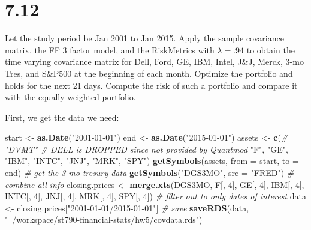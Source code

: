 \documentclass[11pt,]{article}
\newenvironment{Shaded}{\begin{snugshade}}{\end{snugshade}}
\newcommand{\CommentTok}[1]{\textcolor[rgb]{0.56,0.35,0.01}{\textit{#1}}}
\newcommand{\DataTypeTok}[1]{\textcolor[rgb]{0.13,0.29,0.53}{#1}}
\newcommand{\DecValTok}[1]{\textcolor[rgb]{0.00,0.00,0.81}{#1}}
\newcommand{\KeywordTok}[1]{\textcolor[rgb]{0.13,0.29,0.53}{\textbf{#1}}}
\newcommand{\NormalTok}[1]{#1}
\newcommand{\StringTok}[1]{\textcolor[rgb]{0.31,0.60,0.02}{#1}}
\begin{document}
\hypertarget{section-3}{%
\section{7.12}\label{section-3}}

Let the study period be Jan 2001 to Jan 2015. Apply the sample
covariance matrix, the FF 3 factor model, and the RiskMetrics with
\(\lambda = .94\) to obtain the time varying covariance matrix for Dell,
Ford, GE, IBM, Intel, J\&J, Merck, 3-mo Tres, and S\&P500 at the
beginning of each month. Optimize the portfolio and holds for the next
21 days. Compute the risk of such a portfolio and compare it with the
equally weighted portfolio.

First, we get the data we need:

\begin{Shaded}
\begin{Highlighting}[]
\NormalTok{start <-}\StringTok{ }\KeywordTok{as.Date}\NormalTok{(}\StringTok{"2001-01-01"}\NormalTok{)}
\NormalTok{end <-}\StringTok{ }\KeywordTok{as.Date}\NormalTok{(}\StringTok{"2015-01-01"}\NormalTok{)}
\NormalTok{assets <-}\StringTok{ }\KeywordTok{c}\NormalTok{(}\CommentTok{# "DVMT" # DELL is DROPPED since not provided by Quantmod}
  \StringTok{"F"}\NormalTok{, }
  \StringTok{"GE"}\NormalTok{, }
  \StringTok{"IBM"}\NormalTok{, }
  \StringTok{"INTC"}\NormalTok{,}
  \StringTok{"JNJ"}\NormalTok{,}
  \StringTok{"MRK"}\NormalTok{,}
  \StringTok{"SPY"}\NormalTok{)}
\KeywordTok{getSymbols}\NormalTok{(assets, }\DataTypeTok{from =}\NormalTok{ start, }\DataTypeTok{to =}\NormalTok{ end) }
\CommentTok{# get the 3 mo tresury data }
\KeywordTok{getSymbols}\NormalTok{(}\StringTok{"DGS3MO"}\NormalTok{, }\DataTypeTok{src =} \StringTok{"FRED"}\NormalTok{)}
\CommentTok{# combine all info}
\NormalTok{closing.prices <-}\StringTok{ }\KeywordTok{merge.xts}\NormalTok{(DGS3MO, }
\NormalTok{                            F[, }\DecValTok{4}\NormalTok{], }
\NormalTok{                            GE[, }\DecValTok{4}\NormalTok{],}
\NormalTok{                            IBM[, }\DecValTok{4}\NormalTok{],}
\NormalTok{                            INTC[, }\DecValTok{4}\NormalTok{],}
\NormalTok{                            JNJ[, }\DecValTok{4}\NormalTok{], }
\NormalTok{                            MRK[, }\DecValTok{4}\NormalTok{], }
\NormalTok{                            SPY[, }\DecValTok{4}\NormalTok{])}
\CommentTok{# filter out to only dates of interest}
\NormalTok{data <-}\StringTok{ }\NormalTok{closing.prices[}\StringTok{"2001-01-01/2015-01-01"}\NormalTok{]}
\CommentTok{# save}
\KeywordTok{saveRDS}\NormalTok{(data, }\StringTok{"~/workspace/st790-financial-stats/hw5/covdata.rds"}\NormalTok{)}
\end{Highlighting}
\end{Shaded}
\end{document}
